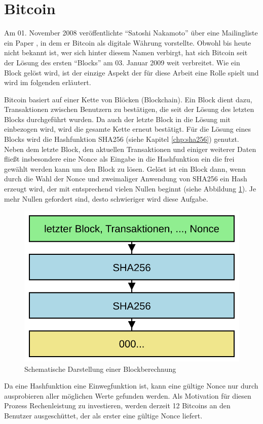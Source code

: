 \section{Bitcoin}
\label{sec:bitcoin}

Am 01. November 2008 veröffentlichte "`Satoshi Nakamoto"' über eine Mailingliste \cite{bitcoinmailinglist} ein Paper \cite{bitcoinpaper}, in dem
er Bitcoin als digitale Währung vorstellte. Obwohl bis heute nicht bekannt ist, wer sich hinter diesem Namen verbirgt, hat sich Bitcoin seit der
Lösung des ersten "`Blocks"' am 03. Januar 2009 \cite{bitcoinblock0} weit verbreitet. Wie ein Block gelöst wird, ist der einzige Aspekt der für
diese Arbeit eine Rolle spielt und wird im folgenden erläutert.

Bitcoin basiert auf einer Kette von Blöcken (Blockchain). Ein Block dient dazu, Transaktionen zwischen Benutzern zu bestätigen, die seit der Lösung
des letzten Blocks durchgeführt wurden. Da auch der letzte Block in die Lösung mit einbezogen wird, wird die gesamte Kette erneut bestätigt.
Für die Lösung eines Blocks wird die Hashfunktion SHA256 (siehe Kapitel \ref{chp:sha256}) genutzt. Neben dem letzte Block, den aktuellen Transaktionen und einiger
weiterer Daten fließt insbesondere eine Nonce als Eingabe in die Hashfunktion ein die frei gewählt werden kann um den Block zu lösen. Gelöst ist ein
Block dann, wenn durch die Wahl der Nonce und zweimaliger Anwendung von SHA256 ein Hash erzeugt wird, der mit entsprechend vielen Nullen beginnt
(siehe Abbildung \ref{fig:bitcoin}). Je mehr Nullen gefordert sind, desto schwieriger wird diese Aufgabe.

\begin{figure}[!h]
  \centering
  \includegraphics[scale=0.4]{images/bitcoin}
  \caption{Schematische Darstellung einer Blockberechnung}
  \label{fig:bitcoin}
\end{figure}

Da eine Hashfunktion eine Einwegfunktion ist, kann eine gültige Nonce nur durch ausprobieren aller möglichen Werte gefunden werden. Als Motivation
für diesen Prozess Rechenleistung zu investieren, werden derzeit 12 Bitcoins an den Benutzer ausgeschüttet, der als erster eine gültige Nonce liefert.



